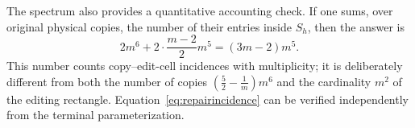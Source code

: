 The spectrum also provides a quantitative accounting check.
If one sums, over original physical copies, the number of their
entries inside $S_h$, then the answer is
\begin{equation}\label{eq:repairincidence}
 2m^6+2\cdot\frac{m-2}{2}m^5
   =(3m-2)m^5.
\end{equation}
This number counts copy--edit-cell incidences with multiplicity;
it is deliberately different from both the number of copies
$\left(\frac52-\frac1m\right)m^6$ and the cardinality $m^2$
of the editing rectangle. Equation~\eqref{eq:repairincidence}
can be verified independently from the terminal parameterization.
